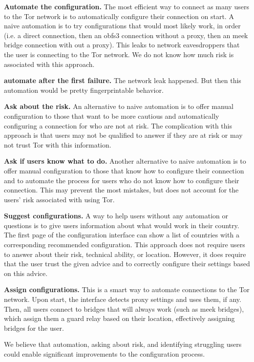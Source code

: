 \documentclass[USenglish,oneside,twocolumn]{article}
\begin{document}
{\begin{description}
\item{\bfseries Automate the configuration.} The most efficient way to connect as many users to the Tor network is to automatically configure their connection on start. A naive automation is to try configurations that would most likely work, in order (i.e. a direct connection, then an obfs3 connection without a proxy, then an meek bridge connection with out a proxy). This leaks to network eavesdroppers that the user is connecting to the Tor network. We do not know how much risk is associated with this approach. 
\item {\bfseries automate after the first failure.} The network leak happened. But then this automation would be pretty fingerprintable behavior. 
\item{\bfseries Ask about the risk.} An alternative to naive automation is to offer manual configuration to those that want to be more cautious and automatically configuring a connection for who are not at risk. The complication with this approach is that users may not be qualified to answer if they are at risk or may not trust Tor with this information. 
\item{\bfseries Ask if users know what to do.} Another alternative to naive automation is to offer manual configuration to those that know how to configure their connection and to automate the process for users who do not know how to configure their connection. This may prevent the most mistakes, but does not account for the users' risk associated with using Tor. 
\item{\bfseries Suggest configurations.} A way to help users without any automation or questions is to give users information about what would work in their country. The first page of the configuration interface can show a list of countries with a corresponding recommended configuration. This approach does not require users to answer about their risk, technical ability, or location. However, it does require that the user trust the given advice and to correctly configure their settings based on this advice. 
\item{\bfseries Assign configurations.} This is a smart way to automate connections to the Tor network. Upon start, the interface detects proxy settings and uses them, if any. Then, all users connect to bridges that will always work (such as meek bridges), which assign them a guard relay based on their location, effectively assigning bridges for the user. 
\end{description}

We believe that automation, asking about risk, and identifying struggling users could enable significant improvements to the configuration process. 
}
\end{document}
